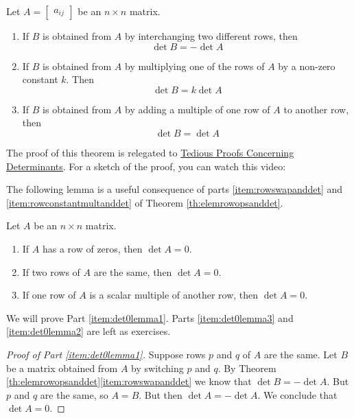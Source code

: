\documentclass{ximera}
\begin{document}
\begin{theorem}\label{th:elemrowopsanddet}
Let $A=\begin{bmatrix}a_{ij}\end{bmatrix}$ be an $n\times n$ matrix.  
\begin{enumerate}
\item\label{item:rowswapanddet}
If $B$ is obtained from $A$ by interchanging two different rows, then $$\det{B}=-\det{A}$$
\item \label{item:rowconstantmultanddet}
If $B$ is obtained from $A$ by multiplying one of the rows of $A$ by a non-zero constant $k$.  Then $$\det{B}=k\det{A}$$
\item \label{item:addmultotherrowdet}
If $B$ is obtained from $A$ by adding a multiple of one row of $A$ to another row, then
$$\det{B}=\det{A}$$
\end{enumerate}
\end{theorem}
The proof of this theorem is relegated to \href{https://ximera.osu.edu/linearalgebradzv3/LinearAlgebraInteractiveIntro/DET-0050/main}{Tedious Proofs Concerning Determinants}.  For a sketch of the proof, you can watch this video:

The following lemma is a useful consequence of parts \ref{item:rowswapanddet} and  \ref{item:rowconstantmultanddet} of Theorem \ref{th:elemrowopsanddet}.

\begin{lemma}\label{lemma:det0lemma}
Let $A$ be an $n\times n$ matrix.  
\begin{enumerate}
\item \label{item:det0lemma3} If $A$ has a row of zeros, then $\det{A}=0$.
\item \label{item:det0lemma1} If two rows of $A$ are the same, then $\det{A}=0$.
\item \label{item:det0lemma2} If one row of $A$ is a scalar multiple of another row, then $\det{A}=0$.
\end{enumerate}
\end{lemma}
We will prove Part \ref{item:det0lemma1}.  Parts  \ref{item:det0lemma3} and \ref{item:det0lemma2} are left as exercises.
\begin{proof}[Proof of Part \ref{item:det0lemma1}]
Suppose rows $p$ and $q$ of $A$ are the same.  Let $B$ be a matrix obtained from $A$ by switching $p$ and $q$.  By Theorem \ref{th:elemrowopsanddet}\ref{item:rowswapanddet} we know that $\det{B}=-\det{A}$. But $p$ and $q$ are the same, so $A=B$.  But then
$\det{A}=-\det{A}$.
We conclude that $\det{A}=0$.
\end{proof}
\end{document}
